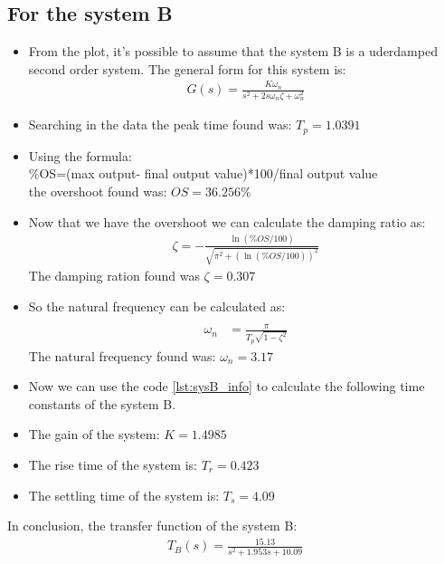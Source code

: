\documentclass[a4paper]{article}
\begin{document}
\subsection*{For the system B}
\begin{itemize}
    \item From the plot, it's possible to assume that the system B is a uderdamped second order system. The general form for this system is:
    \begin{align*}
        G(s)  = \frac{K\omega_n}{s^2+2s\omega_n\zeta+\omega_n^2}
    \end{align*}
    \item Searching in the data the peak time found was: $T_p = 1.0391$
    \item Using the formula:\\ $\%$OS=(max output- final output value)*100/final output value \\the overshoot found was: $OS=36.256\%$
    \item Now that we have the overshoot we can calculate the damping ratio as:
     \begin{align*}
    		\zeta= -\frac{\ln(\%OS/100)}{\sqrt{\pi^2+(\ln(\%OS/100))^2}}
    	\end{align*}
    The damping ration found was $\zeta= 0.307$
    \item So the natural frequency can be calculated as:
    \begin{align*}
    \\\omega_n&=\frac{\pi}{T_p\sqrt{1-\zeta^2}}
    \end{align*} 
    The natural frequency found was: $\omega_n= 3.17$
    \item Now we can use the code \ref{lst:sysB_info} to calculate the following time constants of the system B.
    \item The gain of the system: $K=1.4985$
    \item The rise time of the system is: $T_r=0.423$
    \item The settling time of the system is: $T_s=4.09$
\end{itemize}

In conclusion, the transfer function of the system B:
	\begin{align}
		\label{eq:sys_B_tf}
		T_B(s) = \frac{15.13}{s^2 + 1.953 s + 10.09}
	\end{align}
\end{document}

